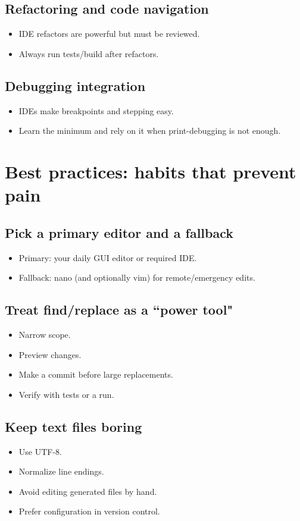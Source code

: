 \subsection{Refactoring and code navigation}
\begin{itemize}
\item IDE refactors are powerful but must be reviewed.
\item Always run tests/build after refactors.
\end{itemize}

\subsection{Debugging integration}
\begin{itemize}
\item IDEs make breakpoints and stepping easy.
\item Learn the minimum and rely on it when print-debugging is not enough.
\end{itemize}

\section{Best practices: habits that prevent pain}
\subsection{Pick a primary editor and a fallback}
\begin{itemize}
\item Primary: your daily GUI editor or required IDE.
\item Fallback: nano (and optionally vim) for remote/emergency edits.
\end{itemize}

\subsection{Treat find/replace as a ``power tool"}
\begin{itemize}
\item Narrow scope.
\item Preview changes.
\item Make a commit before large replacements.
\item Verify with tests or a run.
\end{itemize}

\subsection{Keep text files boring}
\begin{itemize}
\item Use UTF-8.
\item Normalize line endings.
\item Avoid editing generated files by hand.
\item Prefer configuration in version control.
\end{itemize}

